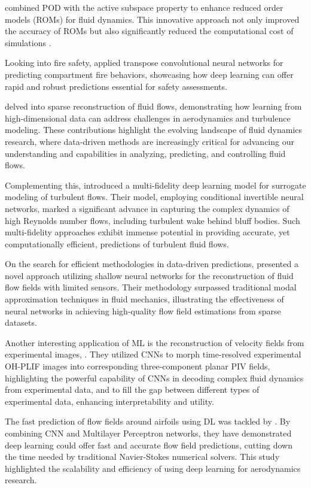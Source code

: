  combined POD with the active subspace property to enhance reduced order models (ROMs) for fluid dynamics. This innovative approach not only improved the accuracy of ROMs but also significantly reduced the computational cost of simulations .

Looking into fire safety, \cite{Hodges2019c} applied transpose convolutional neural networks for predicting compartment fire behaviors, showcasing how deep learning can offer rapid and robust predictions essential for safety assessments.

\cite{Jayaraman2019a, Zhu2019} delved into sparse reconstruction of fluid flows, demonstrating how learning from high-dimensional data can address challenges in aerodynamics and turbulence modeling. These contributions highlight the evolving landscape of fluid dynamics research, where data-driven methods are increasingly critical for advancing our understanding and capabilities in analyzing, predicting, and controlling fluid flows.

Complementing this,  introduced a multi-fidelity deep learning model for surrogate modeling of turbulent flows. Their model, employing conditional invertible neural networks, marked a significant advance in capturing the complex dynamics of high Reynolds number flows, including turbulent wake behind bluff bodies. Such multi-fidelity approaches exhibit immense potential in providing accurate, yet computationally efficient, predictions of turbulent fluid flows.

On the search for efficient methodologies in data-driven predictions, presented a novel approach utilizing shallow neural networks for the reconstruction of fluid flow fields with limited sensors. Their methodology surpassed traditional modal approximation techniques in fluid mechanics, illustrating the effectiveness of neural networks in achieving high-quality flow field estimations from sparse datasets.

Another interesting application of ML is the reconstruction of velocity fields from experimental images, \cite{Barwey2022c}. They utilized CNNs to morph time-resolved experimental OH-PLIF images into corresponding three-component planar PIV fields, highlighting the powerful capability of CNNs in decoding complex fluid dynamics from experimental data, and to fill the gap between different types of experimental data, enhancing interpretability and utility.

The fast prediction of flow fields around airfoils using DL was tackled by . By combining CNN and Multilayer Perceptron networks, they have demonstrated deep learning could offer fast and accurate flow field predictions, cutting down the time needed by traditional Navier-Stokes numerical solvers. This study highlighted the scalability and efficiency of using deep learning for aerodynamics research.

